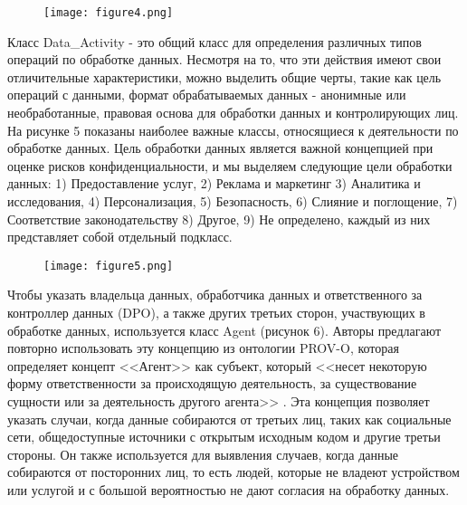 \documentclass[../main]{subfiles}
\begin{document}
\begin{figure}[H]
    \centering
    {\texttt{[image: figure4.png]}}
    \vspace{-\baselineskip}
\end{figure}

Класс Data\_Activity - это общий класс для определения различных типов операций по обработке данных. Несмотря на то, что эти действия имеют свои отличительные характеристики, можно выделить общие черты, такие как цель операций с данными, формат обрабатываемых данных - анонимные или необработанные, правовая основа для обработки данных и контролирующих лиц. На рисунке 5 показаны наиболее важные классы, относящиеся к деятельности по обработке данных. Цель обработки данных является важной концепцией при оценке рисков конфиденциальности, и мы выделяем следующие цели обработки данных: 1) Предоставление услуг, 2) Реклама и маркетинг 3) Аналитика и исследования, 4) Персонализация, 5) Безопасность, 6) Слияние и поглощение, 7) Соответствие законодательству 8) Другое, 9) Не определено, каждый из них представляет собой отдельный подкласс.

\begin{figure}[H]
    \centering
    {\texttt{[image: figure5.png]}}
    \vspace{-\baselineskip}
\end{figure}

Чтобы указать владельца данных, обработчика данных и ответственного за контроллер данных (DPO), а также других третьих сторон, участвующих в обработке данных, используется класс Agent (рисунок 6). Авторы предлагают повторно использовать эту концепцию из онтологии PROV-O, которая определяет концепт <<Агент>> как субъект, который <<несет некоторую форму ответственности за происходящую деятельность, за существование сущности или за деятельность другого агента>> \cite{MDPI22}. Эта концепция позволяет указать случаи, когда данные собираются от третьих лиц, таких как социальные сети, общедоступные источники с открытым исходным кодом и другие третьи стороны. Он также используется для выявления случаев, когда данные собираются от посторонних лиц, то есть людей, которые не владеют устройством или услугой и с большой вероятностью не дают согласия на обработку данных. 
\end{document}
